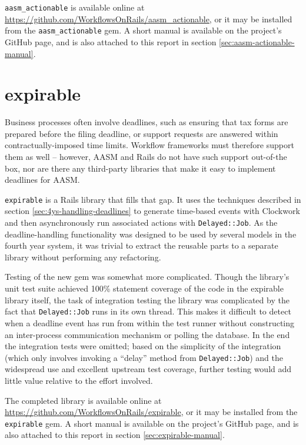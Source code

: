 \documentclass[document.tex]{subfiles}
\begin{document}
\verb!aasm_actionable! is available online at \url{https://github.com/WorkflowsOnRails/aasm_actionable}, or it may be installed from the \verb!aasm_actionable! gem.
A short manual is available on the project's GitHub page, and is also attached to this report in section \ref{sec:aasm-actionable-manual}.

\FloatBarrier


\section {expirable}

Business processes often involve deadlines, such as ensuring that tax forms are prepared before the filing deadline, or support requests are answered within contractually-imposed time limits. Workflow frameworks must therefore support them as well -- however, AASM and Rails do not have such support out-of-the box, nor are there any third-party libraries that make it easy to implement deadlines for AASM.

\verb!expirable! \cite{expirable} is a Rails library that fills that gap. It uses the techniques described in section \ref{sec:4ys-handling-deadlines} to generate time-based events with Clockwork and then asynchronously run associated actions with \verb!Delayed::Job!. As the deadline-handling functionality was designed to be used by several models in the fourth year system, it was trivial to extract the reusable parts to a separate library without performing any refactoring.

Testing of the new gem was somewhat more complicated. Though the library's unit test suite achieved 100\% statement coverage of the code in the expirable library itself, the task of integration testing the library was complicated by the fact that \verb!Delayed::Job! runs in its own thread. This makes it difficult to detect when a deadline event has run from within the test runner without constructing an inter-process communication mechanism or polling the database. In the end the integration tests were omitted; based on the simplicity of the integration (which only involves invoking a ``delay'' method from \verb!Delayed::Job!) and the widespread use and excellent upstream test coverage, further testing would add little value relative to the effort involved.

The completed library is available online at \url{https://github.com/WorkflowsOnRails/expirable}, or it may be installed from the \verb!expirable! gem.
A short manual is available on the project's GitHub page, and is also attached to this report in section \ref{sec:expirable-manual}.


\end{document}
